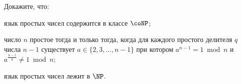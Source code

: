 Докажите, что:
\begin{enumcyr}
    \item язык простых чисел содержится в классе $\coNP$;
    \item число $n$ простое тогда и только тогда, когда для каждого простого делителя $q$ числа $n - 1$
        существует $a \in \{2, 3, \dots, n - 1\}$ при котором $a^{n - 1} = 1 \bmod n$ и $a^{\frac{n -
        1}{q}} \neq 1 \bmod n$;
    \item язык простых чисел лежит в $\NP$.
\end{enumcyr}